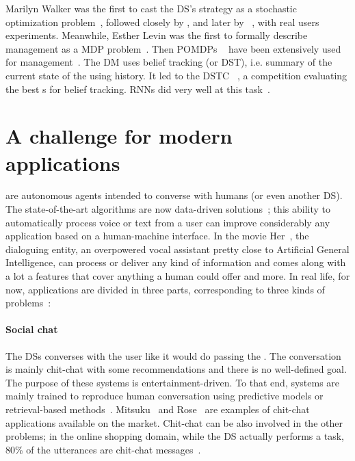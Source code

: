 Marilyn Walker was the first to cast the \gls{DS}'s strategy as a stochastic optimization problem~\parencite{walker1993informational}, followed closely by  \textcite{biermann1996composition}, and later by ~\textcite{walker1998learning}, with real users experiments. Meanwhile, Esther Levin was the first to formally describe  management as a \gls{MDP} problem~\parencite{first-mdp-sds}. Then \glspl{POMDP} ~\parencite{pomdp} have been extensively used for  management~\parencite{roy2000spoken,pomdp-sds}. The \gls{DM} uses belief tracking (or \gls{DST}), i.e. summary of the current state of the  using  history. It led to the \gls{DSTC} ~\parencite{dstc}, a competition evaluating the best s for belief tracking. \glspl{RNN} did very well at this task~\parencite{dstc-rnn}.

\section{A challenge for modern applications}

 are autonomous agents intended to converse with humans (or even another \gls{DS}). The state-of-the-art algorithms are now data-driven solutions~\parencite{lemon2012data}; this ability to automatically process voice or text from a user can improve considerably any application based on a human-machine interface. In the movie Her~\parencite{her}, the dialoguing entity, an overpowered vocal assistant pretty close to Artificial General Intelligence, can process or deliver any kind of information and comes along with a lot a features that cover anything a human could offer and more. In real life, for now,  applications are divided in three parts, corresponding to three kinds of problems~\parencite{Gao2018-neural-approches-convertional-ai}:

\paragraph{Social chat} The \glspl{DS} converses with the user like it would do passing the . The conversation is mainly chit-chat with some recommendations and there is no well-defined goal. The purpose of these systems is entertainment-driven. To that end, systems are mainly trained to reproduce human conversation using predictive models or retrieval-based methods~\parencite{chen2017-survey-sds}. Mitsuku~\parencite{mitsuku} and Rose~\parencite{rose} are examples of chit-chat applications available on the market. Chit-chat can be also involved in the other  problems; in the online shopping domain, while the \gls{DS} actually performs a task, 80\% of the utterances are chit-chat messages~\parencite{Yan2017-sds-online-shopping}.


